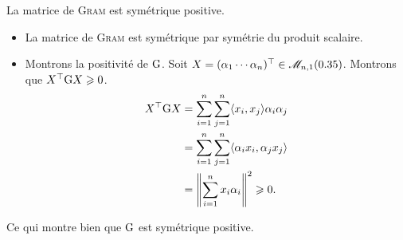 \begin{prop}{}
    La matrice de \textsc{Gram} est symétrique positive.
\end{prop}


\begin{preuve}
    \begin{itemize}
        \item La matrice de \textsc{Gram} est symétrique par symétrie du produit scalaire.
        \item Montrons la positivité de $\mathrm{G}$. Soit $X = (\alpha_1 \cdots \alpha_n)^\top \in \mathscr{M}_{n,1}(0.35)$. Montrons que $X^\top \mathrm{G} X \geqslant 0$. 
        \begin{align*}
            X^\top \mathrm{G} X &= \sum_{i=1}^{n} \sum_{j=1}^{n} \langle x_i, x_j \rangle \alpha_i \alpha_j \\ 
            &= \sum_{i=1}^{n} \sum_{j=1}^{n} \langle \alpha_i x_i, \alpha_j x_j \rangle \\
            &= \left\Vert \sum_{i=1}^{n}x_i \alpha_i \right\Vert^2 \geqslant 0.
        \end{align*}
    \end{itemize}
   
    Ce qui montre bien que $\mathrm{G}$ est symétrique positive.
\end{preuve}

